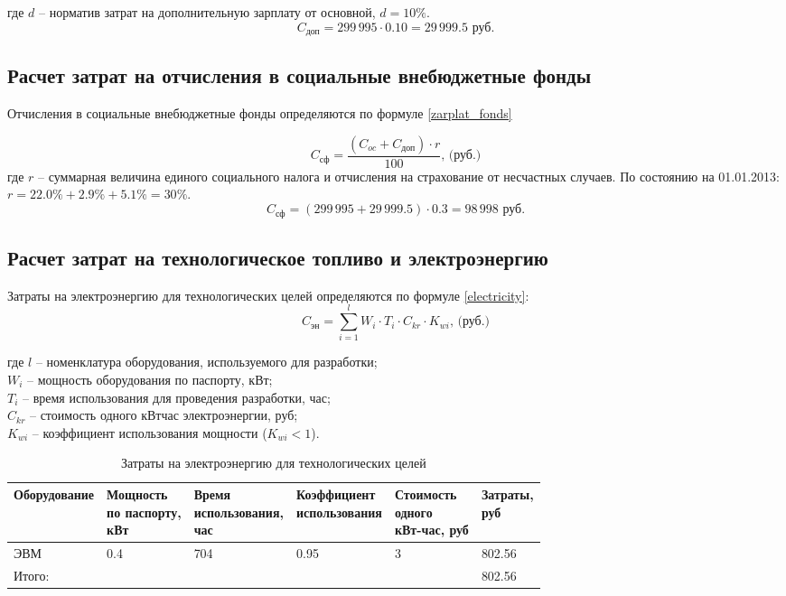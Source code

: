 где $d$ – норматив затрат на дополнительную зарплату от основной, $d=10\%$.
$$
	C_\textit{доп}  = 299\,995 \cdot 0.10 = 29\,999.5 \mbox{ руб.}
$$

\subsection{Расчет затрат на отчисления в социальные внебюджетные фонды}
Отчисления в социальные внебюджетные фонды определяются по формуле \ref{zarplat_fonds}

\begin{equation}
	C_\textit{сф} = \frac{(C_{oc} + C_\textit{доп}) \cdot r}{100} \mbox{, (руб.)}
	\label{zarplat_fonds}
\end{equation} 
где $r$ – суммарная величина единого социального налога  и отчисления на страхование от несчастных случаев. По состоянию на 01.01.2013: $r = 22.0\%	+ 2.9\% + 5.1\% = 30\%$.
$$
	C_\textit{сф} = (299\,995 + 29\,999.5)\cdot 0.3 = 98\,998 \mbox{ руб.}
$$

\subsection{Расчет затрат на технологическое топливо и электроэнергию}
Затраты на электроэнергию для технологических целей определяются по формуле \ref{electricity}:
\begin{equation}
	C_\textit{эн} = \sum_{i=1}^l W_i \cdot T_i \cdot C_{kr} \cdot K_{wi} \mbox{, (руб.)}
	\label{electricity}
\end{equation}

где  $l$ – номенклатура оборудования, используемого для разработки;\\
$W_i$ – мощность оборудования по паспорту, кВт;\\
$T_i$ – время использования для проведения разработки, час;\\
$C_{kr}$ – стоимость одного кВт\textperiodcentered час электроэнергии, руб;\\
$K_{wi}$ – коэффициент использования мощности ($K_{wi} < 1$).\\

\begin{table}[h]
	\caption{Затраты на электроэнергию для технологических целей}
	\begin{tabular}{|l|l|l|l|l|l|}
		\hline
			Оборудование & \thead{Мощность\\ по паспорту,\\кВт} & \thead{Время\\использования,\\час} & \thead{Коэффициент\\использования} & \thead{Стоимость\\одного\\кВт-час, руб} &  \thead{Затраты,\\руб} \\
		\hline
			ЭВМ & 0.4 & 704 & 0.95 & 3 & 802.56 \\
		\hline
			Итого: & & & & & 802.56 \\
		\hline		
	\end{tabular}
\end{table}

